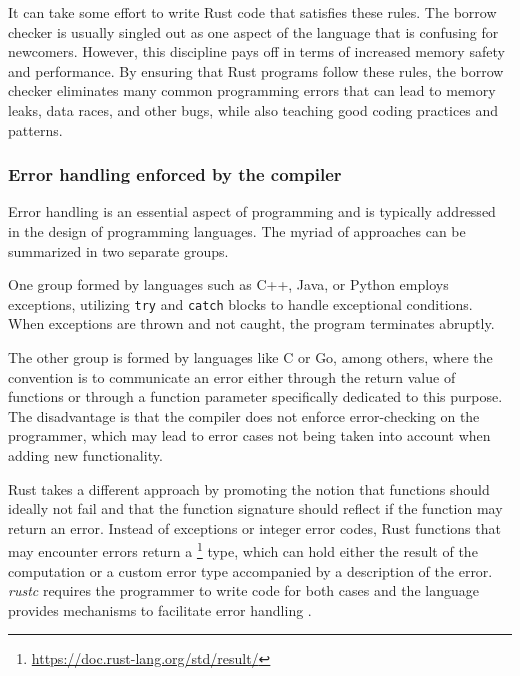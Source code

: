 It can take some effort to write Rust code that satisfies these rules.
The borrow checker is usually singled out as
one aspect of the language that is confusing for newcomers.
However, this discipline pays off in terms of
increased memory safety and performance.
By ensuring that Rust programs follow these rules,
the borrow checker eliminates many common programming errors
that can lead to memory leaks, data races, and other bugs,
while also teaching good coding practices and patterns.

\subsubsection{Error handling enforced by the compiler}

Error handling is an essential aspect of programming and
is typically addressed in the design of programming languages.
The myriad of approaches can be summarized in two separate groups.

One group formed by languages such as C++, Java, or Python employs exceptions,
utilizing \texttt{try} and \texttt{catch} blocks to handle exceptional conditions.
When exceptions are thrown and not caught, the program terminates abruptly.

The other group is formed by languages like C or Go, among others,
where the convention is to communicate an error either through the return value of functions
or through a function parameter specifically dedicated to this purpose.
The disadvantage is that the compiler does not enforce error-checking on the programmer,
which may lead to error cases not being taken into account when adding new functionality.

Rust takes a different approach by promoting the notion that functions should ideally not fail
and that the function signature should reflect if the function may return an error.
Instead of exceptions or integer error codes,
Rust functions that may encounter errors return a
\footnote{\url{https://doc.rust-lang.org/std/result/}} type,
which can hold either the result of the computation
or a custom error type accompanied by a description of the error.
\emph{rustc} requires the programmer to write code for both cases
and the language provides mechanisms to facilitate error handling \cite[Chap. 9.2]{rust-book}.

